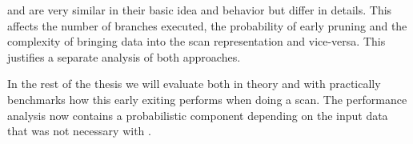\bwv{} and \bs{} are very similar in their basic idea and behavior but differ in
details. This affects the number of branches executed, the probability of early
pruning and the complexity of bringing data into the scan representation and
vice-versa. This justifies a separate analysis of both approaches.

In the rest of the thesis we will evaluate both in theory and with practically
benchmarks how this early exiting performs when doing a scan. The performance
analysis now contains a probabilistic component depending on the input data that
was not necessary with \simdscan{}.
